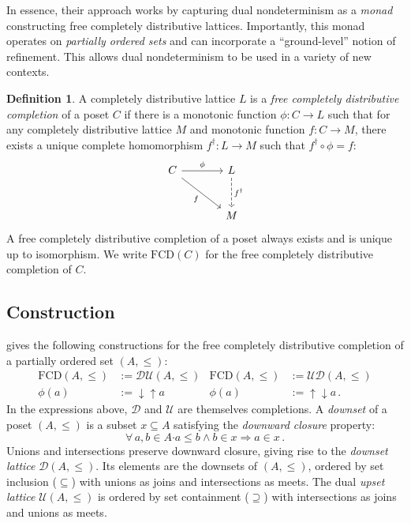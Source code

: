 \documentclass[11pt,oneside]{book}
\theoremstyle{definition}
\newtheorem{definition}[theorem]{Definition}
\newcommand{\bdot}{\boldsymbol{\cdot}}
\begin{document}
In essence,
their approach works by
capturing dual nondeterminism as a \emph{monad}
constructing free completely distributive lattices.
Importantly,
this monad operates on \emph{partially ordered sets}
and can incorporate
a ``ground-level'' notion of refinement.
This allows dual nondeterminism to be used
in a variety of new contexts.

\begin{definition} \label{def:fcd}
A completely distributive lattice $L$ is a
\emph{free completely distributive completion} of
a poset $C$ if there is
a monotonic function $\phi : C \rightarrow L$
such that
for any completely distributive lattice $M$
and monotonic function $f : C \rightarrow M$,
there exists a unique complete homomorphism
$f^\dagger : L \rightarrow M$
such that
$f^\dagger \circ \phi = f$:
\[
  \begin{tikzcd}[sep=large]
    C \arrow[r, "\phi"] \arrow[rd, "f"'] &
    L \arrow[d, "f^\dagger", dashed] \\ & M
  \end{tikzcd}
\]
A free completely distributive completion of a poset
always exists and is unique up to isomorphism.
We write $\mathrm{FCD}(C)$ for
the free completely distributive completion of $C$.
\end{definition}

\subsection{Construction} %

\citet{augtyp} gives the following constructions for
the free completely distributive completion of
a partially ordered set $(A, \le)$:
\begin{align*}
  \mathrm{FCD}(A, {\le}) &:= \mathcal{D} \mathcal{U}(A, {\le}) &
  \mathrm{FCD}(A, {\le}) &:= \mathcal{U} \mathcal{D}(A, {\le}) \\
  \phi(a) &:= {\downarrow}{\uparrow} a &
  \phi(a) &:= {\uparrow}{\downarrow} a \,.
\end{align*}
In the expressions above,
$\mathcal{D}$ and $\mathcal{U}$
are themselves completions.
A \emph{downset} of a poset $(A, {\le})$
is a subset $x \subseteq A$ satisfying
the \emph{downward closure} property:
\[
  \forall \, a, b \in A \bdot
          a \le b \wedge b \in x \Rightarrow a \in x \,.
\]
Unions and intersections preserve downward closure,
giving rise to the \emph{downset lattice} $\mathcal{D}(A, {\le})$.
Its elements are the downsets of $(A, {\le})$,
ordered by set inclusion (${\subseteq}$) with
unions as joins and intersections as meets.
The dual \emph{upset lattice} $\mathcal{U}(A, {\le})$
is ordered by set containment (${\supseteq}$) with
intersections as joins and unions as meets.
\end{document}
